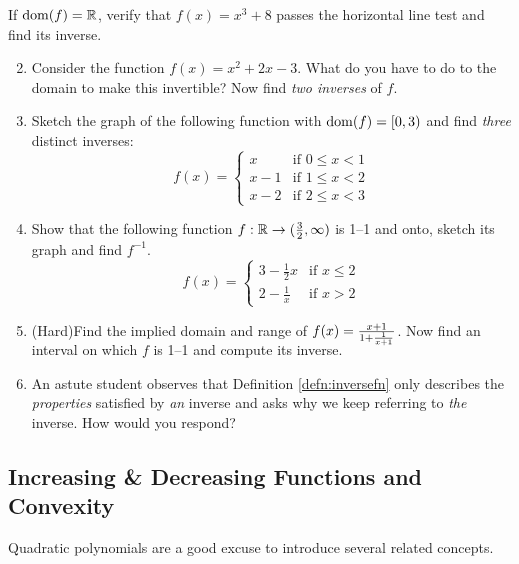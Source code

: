 \begin{exercises}{}{}
\exstart If $\operatorname{dom}(f)=\mathbb{R}$, verify that $f(x)=x^3+8$ passes the horizontal line test and find its inverse.
\begin{enumerate}\setcounter{enumi}{1}
  \item Consider the function $f(x)=x^2+2x-3$. What do you have to do to the domain to make this invertible? Now find \emph{two inverses} of $f$.
  
  \item Sketch the graph of the following function with $\operatorname{dom}(f)=[0,3)$ and find \emph{three} distinct inverses:
  \[f(x)=\begin{cases}
  x&\text{if }0\le x<1\\
  x-1&\text{if }1\le x<2\\
  x-2&\text{if }2\le x<3
  \end{cases}\]
	

  \item Show that the following function $f:\mathbb{R}\to(\frac 32,\infty)$ is 1--1 and onto, sketch its graph and find $f^{-1}$. 
  \[f(x)=\begin{cases}
  3-\frac 12x&\text{if }x\le 2\\
  2-\frac 1x&\text{if }x>2
  \end{cases}\]
  
  \item (Hard)\lstsp Find the implied domain and range of $f(x)=\smash[b]{\frac{x+1}{1+\frac 1{x+1}}}$. Now find an interval on which $f$ is 1--1 and compute its inverse.
  
  \item An astute student observes that Definition \ref{defn:inversefn} only describes the \emph{properties} satisfied by \emph{an} inverse and asks why we keep referring to \emph{the} inverse. How would you respond?
  
\end{enumerate}
\end{exercises}

\iffalse
\clearpage



\subsection{Increasing \& Decreasing Functions and Convexity}



Quadratic polynomials are a good excuse to introduce several related concepts.

